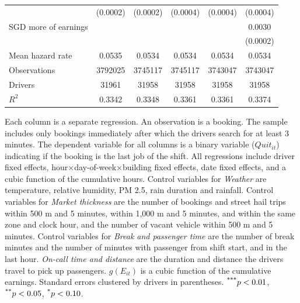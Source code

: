 \documentclass[reviewmode,AEJ]{AEA}
\begin{document}
\begin{table}[]
{\begin{tabularx}{\textwidth}{l@{\extracolsep{\fill}}*{5}{S[table-format = 0.4, table-space-text-pre={**}, table-space-text-post={-**}]}}
                &    (0.0002)         &    (0.0002)         &    (0.0004)         &    (0.0004)         &    (0.0004)         \\
     SGD more of earnings&                     &                     &                     &                     &      0.0030\sym{***}         \\
                &                     &                     &                     &                     &    (0.0002)         \\
    \midrule
    Mean hazard rate&      0.0535         &      0.0534         &      0.0534         &      0.0534         &      0.0534         \\
    Observations&\num{3792025}         &\num{3745117}         &\num{3745117}         &\num{3743047}         &\num{3743047}         \\
    Drivers     & \num{31961}         & \num{31958}         & \num{31958}         & \num{31958}         & \num{31958}         \\
    \(R^2\)     &      0.3342         &      0.3348         &      0.3361         &      0.3361         &      0.3374         \\
    \bottomrule
    \end{tabularx}
    }
	\begin{tablenotes}
	\small
        Each column is a separate regression. An observation is a booking. The sample includes only bookings immediately after which the drivers search for at least 3 minutes. The dependent variable for all columns is a binary variable ($Quit_{it}$) indicating if the booking is the last job of the shift. All regressions include driver fixed effects, hour\(\times\)day-of-week\(\times\)building fixed effects, date fixed effects, and a cubic function of the cumulative hours. Control variables for \textit{Weather} are temperature, relative humidity, PM 2.5, rain duration and rainfall. Control variables for \textit{Market thickness} are the number of bookings and street hail trips within 500 m and 5 minutes, within 1,000 m and 5 minutes, and within the same zone and clock hour, and the number of vacant vehicle within 500 m and 5 minutes. Control variables for \textit{Break and passenger time} are the number of break minutes and the number of minutes with passenger from shift start, and in the last hour. \textit{On-call time and distance} are the duration and distance the drivers travel to pick up passengers. \(g(E_{it})\) is a cubic function of the cumulative earnings. Standard errors clustered by drivers in parentheses. $\textsuperscript{***}p < 0.01$, $\textsuperscript{**}p < 0.05$, $\textsuperscript{*}p < 0.10$. 
	\end{tablenotes}
\end{table}
\end{document}

